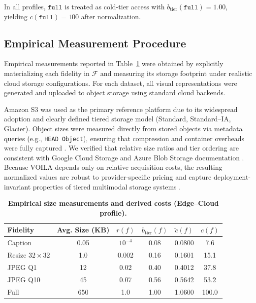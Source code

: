 In all profiles, $\texttt{full}$ is treated as cold-tier access with
$b_{\mathrm{tier}}(\texttt{full}) = 1.00$, yielding $c(\texttt{full}) = 100$
after normalization.

\subsection{Empirical Measurement Procedure}
\label{sec:measurement}

Empirical measurements reported in
Table~\ref{tab:empirical_sizes_to_costs} were obtained by explicitly
materializing each fidelity in $\mathcal{F}$ and measuring its storage footprint
under realistic cloud storage configurations.
For each dataset, all visual representations were generated and uploaded to
object storage using standard cloud backends.

Amazon S3 was used as the primary reference platform due to its widespread
adoption and clearly defined tiered storage model (Standard, Standard--IA,
Glacier).
Object sizes were measured directly from stored objects via metadata queries
(e.g., \texttt{HEAD Object}), ensuring that compression and container overheads
were fully captured
\cite{aws_s3_storage_classes, aws_s3_pricing}.
We verified that relative size ratios and tier ordering are consistent with
Google Cloud Storage and Azure Blob Storage documentation
\cite{gcs_storage_classes, azure_blob_storage}.
Because \textsc{VOILA} depends only on relative acquisition costs, the resulting
normalized values are robust to provider-specific pricing and capture
deployment-invariant properties of tiered multimodal storage systems
\cite{hennessy2011computer}.

\begin{table}[t]
\centering
\small
\caption{\textbf{Empirical size measurements and derived costs (Edge--Cloud profile).}}
\label{tab:empirical_sizes_to_costs}
\begin{tabular}{lccccc}
\toprule
\textbf{Fidelity} &
\textbf{Avg. Size (KB)} &
$r(f)$ &
$b_{\mathrm{tier}}(f)$ &
$\tilde{c}(f)$ &
$c(f)$ \\
\midrule
Caption & 0.05 & $10^{-4}$ & 0.08 & 0.0800 & 7.6 \\
Resize $32{\times}32$ & 1.0 & 0.002 & 0.16 & 0.1601 & 15.1 \\
JPEG Q1 & 12 & 0.02 & 0.40 & 0.4012 & 37.8 \\
JPEG Q10 & 45 & 0.07 & 0.56 & 0.5642 & 53.2 \\
Full & 650 & 1.0 & 1.00 & 1.0600 & 100.0 \\
\bottomrule
\end{tabular}
\end{table}

